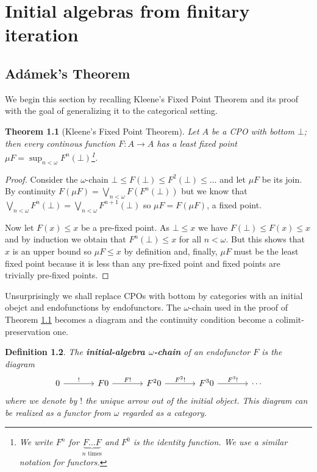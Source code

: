 \documentclass[letterpaper, 11pt, oneside]{memoir}
\theoremstyle{myteo}
\newtheorem{theorem}{Theorem}[section]
\newtheorem{definition}[theorem]{Definition}
\numberwithin{equation}{section}
\newcommand{\marginnote}[1]{\marginpar{\footnotesize #1}}
\begin{document}
\chapter{Initial algebras from finitary iteration}
\label{ch:initial_algebras_iteration}
\newpage

\section{Adámek's Theorem}

We begin this section by recalling Kleene's Fixed Point Theorem and its proof with the goal of generalizing it to the categorical setting.

\begin{theorem}[Kleene's Fixed Point Theorem]
  \label{teo:kleene}
  Let \(A\) be a CPO with bottom \(\bot\); then every continous function \(F \colon A \to A\) has a least fixed point \(\mu F = \sup_{n < \omega}F^n(\bot)\)\footnote{We write \(F^n\) for \(\underbrace{F \ldots F}_{n \text{ times}}\) and \(F^0\) is the identity function. We use a similar notation for functors.}.
\end{theorem}

\begin{proof}
  Consider the \(\omega\)-chain \(\bot \leq F(\bot) \leq F^2(\bot) \leq \ldots\) and let \(\mu F\) be its join.
  By continuity \(F(\mu F) = \bigvee_{n < \omega}F(F^n(\bot))\) but we know that \(\bigvee_{n < \omega}F^n(\bot) = \bigvee_{n < \omega}F^{n+1}(\bot)\) so \(\mu F = F(\mu F)\), a fixed point.

  Now let \(F(x) \leq x\) be a pre-fixed point.
  As \(\bot \leq x\) we have \(F(\bot) \leq F(x) \leq x\) and by induction we obtain that \(F^n(\bot) \leq x\) for all \(n < \omega\).
  But this shows that \(x\) is an upper bound so \(\mu F \leq x\) by definition and, finally, \(\mu F\) must be the least fixed point because it is less than any pre-fixed point and fixed points are trivially pre-fixed points.
\end{proof}

Unsurprisingly we shall replace CPOs with bottom by categories with an initial obejct and endofunctions by endofunctors.
The \(\omega\)-chain used in the proof of Theorem \ref{teo:kleene} becomes a diagram and the continuity condition become a colimit-preservation one.

\begin{definition}
  The \textbf{initial-algebra \(\omega\)-chain}\marginnote{initial-algebra \(\omega\)-chain} of an endofunctor \(F\) is the diagram
  \begin{equation}
    \label{dia:initial_chain}
    \begin{tikzcd}[sep = large]
      0 \ar[r, "!"] & F0 \ar[r, "F!"] & F^20 \ar[r, "F^2!"] & F^30 \ar[r, "F^3!"] & \cdots
    \end{tikzcd}
  \end{equation}
  where we denote by \(!\) the unique arrow out of the initial object.
  This diagram can be realized as a functor from \(\omega\) regarded as a category.
\end{definition}
\end{document}
